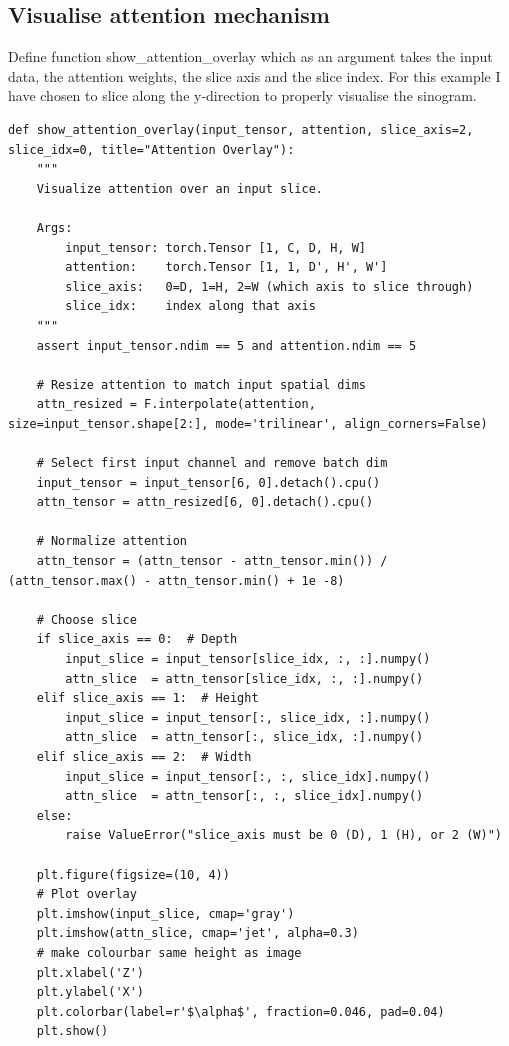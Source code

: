 \subsection{Visualise attention mechanism}

Define function show\_attention\_overlay which as an argument takes the input data, the attention weights, the slice axis and the slice index.
For this example I have chosen to slice along the y-direction to properly visualise the sinogram.

\begin{verbatim}
def show_attention_overlay(input_tensor, attention, slice_axis=2, slice_idx=0, title="Attention Overlay"):
    """
    Visualize attention over an input slice.

    Args:
        input_tensor: torch.Tensor [1, C, D, H, W]
        attention:    torch.Tensor [1, 1, D', H', W']
        slice_axis:   0=D, 1=H, 2=W (which axis to slice through)
        slice_idx:    index along that axis
    """
    assert input_tensor.ndim == 5 and attention.ndim == 5

    # Resize attention to match input spatial dims
    attn_resized = F.interpolate(attention, size=input_tensor.shape[2:], mode='trilinear', align_corners=False)

    # Select first input channel and remove batch dim
    input_tensor = input_tensor[6, 0].detach().cpu()
    attn_tensor = attn_resized[6, 0].detach().cpu()
    
    # Normalize attention
    attn_tensor = (attn_tensor - attn_tensor.min()) / (attn_tensor.max() - attn_tensor.min() + 1e -8)

    # Choose slice
    if slice_axis == 0:  # Depth
        input_slice = input_tensor[slice_idx, :, :].numpy()
        attn_slice  = attn_tensor[slice_idx, :, :].numpy()
    elif slice_axis == 1:  # Height
        input_slice = input_tensor[:, slice_idx, :].numpy()
        attn_slice  = attn_tensor[:, slice_idx, :].numpy()
    elif slice_axis == 2:  # Width
        input_slice = input_tensor[:, :, slice_idx].numpy()
        attn_slice  = attn_tensor[:, :, slice_idx].numpy()
    else:
        raise ValueError("slice_axis must be 0 (D), 1 (H), or 2 (W)")

    plt.figure(figsize=(10, 4))
    # Plot overlay
    plt.imshow(input_slice, cmap='gray')
    plt.imshow(attn_slice, cmap='jet', alpha=0.3)
    # make colourbar same height as image
    plt.xlabel('Z')
    plt.ylabel('X')
    plt.colorbar(label=r'$\alpha$', fraction=0.046, pad=0.04)
    plt.show()
\end{verbatim}

